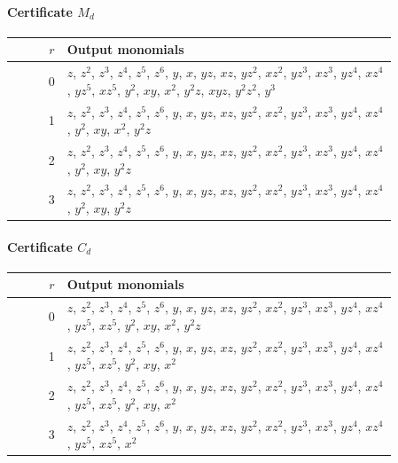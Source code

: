 \documentclass[11pt]{amsart}
\theoremstyle{definition}
\theoremstyle{remark}
\numberwithin{equation}{section}
\begin{document}
\paragraph*{Certificate $M_d$}
\begin{center}
\begin{tabular}{rp{0.86\linewidth}}
$r$ & Output monomials\\\hline
0 & \(z\), \(z^{2}\), \(z^{3}\), \(z^{4}\), \(z^{5}\), \(z^{6}\), \(y\), \(x\), \(yz\), \(xz\), \(yz^{2}\), \(xz^{2}\), \(yz^{3}\), \(xz^{3}\), \(yz^{4}\), \(xz^{4}\), \(yz^{5}\), \(xz^{5}\), \(y^{2}\), \(xy\), \(x^{2}\), \(y^{2}z\), \(xyz\), \(y^{2}z^{2}\), \(y^{3}\)\\
1 & \(z\), \(z^{2}\), \(z^{3}\), \(z^{4}\), \(z^{5}\), \(z^{6}\), \(y\), \(x\), \(yz\), \(xz\), \(yz^{2}\), \(xz^{2}\), \(yz^{3}\), \(xz^{3}\), \(yz^{4}\), \(xz^{4}\), \(y^{2}\), \(xy\), \(x^{2}\), \(y^{2}z\)\\
2 & \(z\), \(z^{2}\), \(z^{3}\), \(z^{4}\), \(z^{5}\), \(z^{6}\), \(y\), \(x\), \(yz\), \(xz\), \(yz^{2}\), \(xz^{2}\), \(yz^{3}\), \(xz^{3}\), \(yz^{4}\), \(xz^{4}\), \(y^{2}\), \(xy\), \(y^{2}z\)\\
3 & \(z\), \(z^{2}\), \(z^{3}\), \(z^{4}\), \(z^{5}\), \(z^{6}\), \(y\), \(x\), \(yz\), \(xz\), \(yz^{2}\), \(xz^{2}\), \(yz^{3}\), \(xz^{3}\), \(yz^{4}\), \(xz^{4}\), \(y^{2}\), \(xy\), \(y^{2}z\)\\
\end{tabular}
\end{center}

\paragraph*{Certificate $C_d$}
\begin{center}
\begin{tabular}{rp{0.86\linewidth}}
$r$ & Output monomials\\\hline
0 & \(z\), \(z^{2}\), \(z^{3}\), \(z^{4}\), \(z^{5}\), \(z^{6}\), \(y\), \(x\), \(yz\), \(xz\), \(yz^{2}\), \(xz^{2}\), \(yz^{3}\), \(xz^{3}\), \(yz^{4}\), \(xz^{4}\), \(yz^{5}\), \(xz^{5}\), \(y^{2}\), \(xy\), \(x^{2}\), \(y^{2}z\)\\
1 & \(z\), \(z^{2}\), \(z^{3}\), \(z^{4}\), \(z^{5}\), \(z^{6}\), \(y\), \(x\), \(yz\), \(xz\), \(yz^{2}\), \(xz^{2}\), \(yz^{3}\), \(xz^{3}\), \(yz^{4}\), \(xz^{4}\), \(yz^{5}\), \(xz^{5}\), \(y^{2}\), \(xy\), \(x^{2}\)\\
2 & \(z\), \(z^{2}\), \(z^{3}\), \(z^{4}\), \(z^{5}\), \(z^{6}\), \(y\), \(x\), \(yz\), \(xz\), \(yz^{2}\), \(xz^{2}\), \(yz^{3}\), \(xz^{3}\), \(yz^{4}\), \(xz^{4}\), \(yz^{5}\), \(xz^{5}\), \(y^{2}\), \(xy\), \(x^{2}\)\\
3 & \(z\), \(z^{2}\), \(z^{3}\), \(z^{4}\), \(z^{5}\), \(z^{6}\), \(y\), \(x\), \(yz\), \(xz\), \(yz^{2}\), \(xz^{2}\), \(yz^{3}\), \(xz^{3}\), \(yz^{4}\), \(xz^{4}\), \(yz^{5}\), \(xz^{5}\), \(x^{2}\)\\
\end{tabular}
\end{center}
\end{document}
